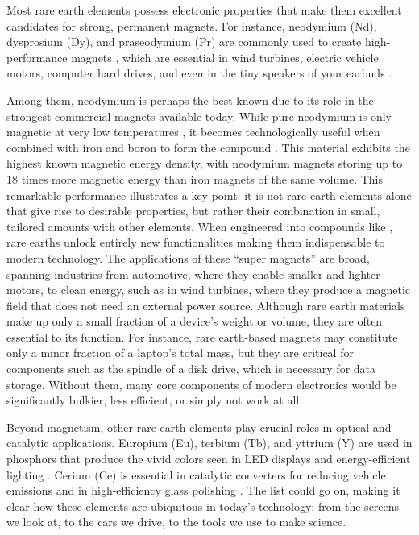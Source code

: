 \documentclass[letterpaper,10pt]{article}
\begin{document}
Most rare earth elements possess electronic properties that make them excellent candidates for strong, permanent magnets. For instance, neodymium (Nd), dysprosium (Dy), and praseodymium (Pr) are commonly used to create high-performance magnets \cite{Dent2012, aemree_dysprosium_2025, Voncken2016}, which are essential in wind turbines, electric vehicle motors, computer hard drives, and even in the tiny speakers of your earbuds \cite{stanfordmagnets_neodymium}.
\newline  
\par
Among them, neodymium is perhaps the best known due to its role in the strongest commercial magnets available today. While pure neodymium is only magnetic at very low temperatures \cite{wikipedia_neodymium}, it becomes technologically useful when combined with iron and boron to form the compound . This material exhibits the highest known magnetic energy density, with neodymium magnets storing up to 18 times more magnetic energy than iron magnets of the same volume. This remarkable performance illustrates a key point: it is not rare earth elements alone that give rise to desirable properties, but rather their combination in small, tailored amounts with other elements. When engineered into compounds like , rare earths unlock entirely new functionalities making them indispensable to modern technology. The applications of these “super magnets” are broad, spanning industries from automotive, where they enable smaller and lighter motors, to clean energy, such as in wind turbines, where they produce a magnetic field that does not need an external power source. Although rare earth materials make up only a small fraction of a device’s weight or volume, they are often essential to its function. For instance, rare earth-based magnets may constitute only a minor fraction of a laptop’s total mass, but they are critical for components such as the spindle of a disk drive, which is necessary for data storage.  Without them, many core components of modern electronics would be significantly bulkier, less efficient, or simply not work at all.
\newline  
\par
Beyond magnetism, other rare earth elements play crucial roles in optical and catalytic applications. Europium (Eu), terbium (Tb), and yttrium (Y) are used in phosphors that produce the vivid colors seen in LED displays and energy-efficient lighting \cite{Zhang2017}. Cerium (Ce) is essential in catalytic converters for reducing vehicle emissions and in high-efficiency glass polishing \cite{Dey2020, Janovs2016}. The list could go on, making it clear how these elements are ubiquitous in today’s technology: from the screens we look at, to the cars we drive, to the tools we use to make science.
\end{document}
